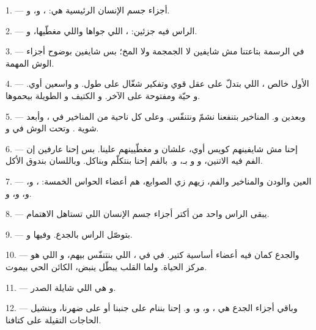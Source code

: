 \VUsaut{2.4mm}
\VUsaut{3.0mm}

\VUsaut{3.0mm}

1. --- أجزاء جسم الإنسان الرئيسية هي: ، و،
و.

2. --- الراس فيه جزئين: ، اللي جواها  واللي
 مغطّيها، و.

3. --- في الرسمة بتاعتنا مش شايفين لا الجمجمة ولا المخ؛ بس شايفين بوضوح
أجزاء الوش المهمة.

4. --- الأول خالص ، اللي بتدلّ على عقل قوي وتفكير شغّال على
طول. و واسعين أوي. و حيّة ومفتوحة على الآخر.
و الكتيف و الطويلة بيحموها.

5. --- وبعدين  و. المناخير بتنفعنا نشمّ
ونتنفّس. وعلى كل ناحية من المناخير في ، وأبعد شوية
. وتحت الوش في  و.

6. --- إحنا مش شايفينهم كويس أوي، علشان  و
مغطّيينهم علينا. بس إحنا عارفين إن الفم فيه  الاتنين،
و و بـ، و.
بالفم إحنا بنتكلّم وبناكل. وباللسان بندوق الأكل.

7. --- العين والودن والمناخير والفم، زيهم زي الصوابع، هم أعضاء الحواس
الخمسة: ، و، و، و،
و.

8. --- يبقى الراس واحد من أكتر أجزاء جسم الإنسان اللي تستاهل الاهتمام.

\VUsaut{4.4mm}
\VUsaut{3.0mm}

9. ---  بتوصّل الراس بالجدع. وفيها 
و.

10. --- والجدع كمان فيه أعضاء أساسية كتير. في  في
، اللي بنتنفّس بيهم، و اللي هو مركز الحياة. ولما
القلب يبطّل ينبض، الكائن الحي بيموت.

11. --- و هي اللي شايلة الصدر.

12. --- وباقي أجزاء الجدع هي ، و،
و، و. إحنا بننام على جنبنا أو على ضهرنا، وبنشيل
الحاجات التقيلة على كتافنا.

